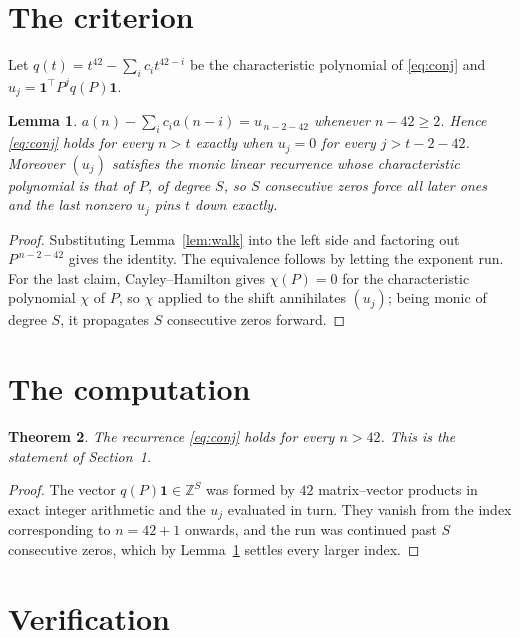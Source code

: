 \documentclass[11pt,a4paper]{article}
\theoremstyle{plain}
\newtheorem{theorem}{Theorem}
\newtheorem{lemma}[theorem]{Lemma}
\theoremstyle{definition}
\begin{document}
\section{The criterion}

Let $q(t)=t^{42}-\sum_i c_i t^{42-i}$ be the characteristic polynomial of
\eqref{eq:conj} and $u_j=\mathbf{1}^{\!\top}P^{j}q(P)\mathbf{1}$.

\begin{lemma}\label{lem:crit}
$a(n)-\sum_i c_i a(n-i)=u_{\,n-2-42}$ whenever $n-42\ge2$. Hence
\eqref{eq:conj} holds for every $n>t$ exactly when $u_j=0$ for every
$j>t-2-42$. Moreover $(u_j)$ satisfies the monic linear recurrence whose
characteristic polynomial is that of $P$, of degree $S$, so $S$ consecutive zeros force all
later ones and the last nonzero $u_j$ pins $t$ down exactly.
\end{lemma}

\begin{proof}
Substituting Lemma~\ref{lem:walk} into the left side and factoring out
$P^{\,n-2-42}$ gives the identity. The equivalence follows by letting the exponent
run. For the last claim, Cayley--Hamilton gives $\chi(P)=0$ for the characteristic
polynomial $\chi$ of $P$, so $\chi$ applied to the shift annihilates $(u_j)$; being monic of
degree $S$, it propagates $S$ consecutive zeros forward.
\end{proof}

\section{The computation}

\begin{theorem}
The recurrence \eqref{eq:conj} holds for every $n>42$. This is the statement of
Section~1.
\end{theorem}

\begin{proof}
The vector $q(P)\mathbf{1}\in\mathbb{Z}^{S}$ was formed by $42$ matrix--vector
products in exact integer arithmetic and the $u_j$ evaluated in turn. They vanish from the
index corresponding to $n=42+1$ onwards, and the run was continued past $S$ consecutive
zeros, which by Lemma~\ref{lem:crit} settles every larger index.
\end{proof}

\section{Verification}
\end{document}
